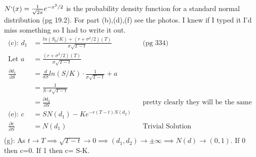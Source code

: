 \documentclass[12pt]{article}
\newenvironment{problem}[3][Problem]{\begin{trivlist}
\item[\hskip \labelsep {\bfseries #1}\hskip \labelsep {\bfseries #2.}]}{\end{trivlist}}
\begin{document}
\newpage
\begin{problem}{15.17}. $N`(x) = \frac{1}{\sqrt{2\pi }}e^{-x^2/2}$ is the probability density function for a standard normal distribution (pg 19.2). For part (b),(d),(f) see the photos. I knew if I typed it I\rq{}d miss something so I had to write it out. 
\begin{align*}
\text{(c):  } d_1 &= \frac{ln(S_0/K) + (r+\sigma^2/2)(T)}{\sigma \sqrt{T-t}}  && \text{(pg 334)} \\
\text{Let } a&= \frac{(r+\sigma^2/2)(T)}{\sigma \sqrt{T-t}} \\ 
\frac{\partial d_1}{\partial S} &=  \frac{d}{dS}ln(S/K) \cdot \frac{1}{\sigma \sqrt{T-t}} + a \\
&= \frac{1}{S \cdot  \sigma \sqrt{T-t}} \\
&= \frac{\partial d_2}{\partial S} &&\text{pretty clearly they will be the same} \\
\text{(e):  }c &= SN(d_1) - Ke^{-r(T-t)N(d_2)} \\
\frac{\partial c}{\partial S} &= N(d_1) &&\text{Trivial Solution} \\
\end{align*}
(g):  As $t\rightarrow T \implies \sqrt{T-t} \rightarrow 0 \implies (d_1,d_2) \rightarrow \pm \infty \implies N(d) \rightarrow (0,1).$ If 0 then c=0. If 1 then c= S-K. 


\end{problem}
\end{document}
